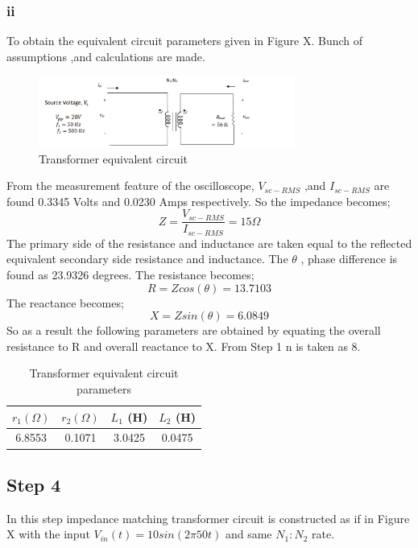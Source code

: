 \documentclass[letterpaper,12pt]{article}
\begin{document}
\subsubsection{ii}
To obtain the equivalent circuit parameters given in Figure X. Bunch of assumptions ,and calculations are made.
\begin{figure}[H]
    \centering
    \includegraphics[width = 0.75\textwidth]{2.png}
    \caption{Transformer equivalent circuit}
\end{figure} 
From the measurement feature of the oscilloscope, \(V_{sc-RMS}\) ,and \(I_{sc-RMS}\) are found 0.3345 Volts and 0.0230 Amps respectively. So the impedance becomes;
\[
    Z = \frac{V_{sc-RMS}}{I_{sc-RMS}} = 15 \Omega
    \]
The primary side of the resistance and inductance are taken equal to the reflected equivalent secondary side resistance and inductance. The \(\theta\) , phase difference is found as 23.9326 degrees. The resistance becomes;
\[
    R = Z cos (\theta) = 13.7103
    \]
    The reactance becomes;
    \[
    X = Z sin (\theta) = 6.0849 
    \]
So as a result the following parameters are obtained by equating the overall resistance to R and overall reactance to X. From Step 1 n is taken as 8.
\begin{table}[H]
    \begin{center}
        \caption{Transformer equivalent circuit parameters}
        \vspace{2mm}
        \begin{tabular}{||c | c | c | c ||} 
            \hline
            \(r_1 (\Omega) \) & \(r_2 (\Omega)\)  & \(L_1\) (H) & \(L_2\) (H) \\ [0.5ex] 
            \hline\hline
            6.8553 & 0.1071 & 3.0425 & 0.0475 \\ 
            \hline
        \end{tabular}
    \end{center}
    \end{table}
    

\subsection{Step 4}
In this step impedance matching transformer circuit is constructed as if in Figure X with the input \(V_{in}(t) = 10sin(2\pi50t)\) and same \(N_1:N_2\) rate. 
\end{document}
